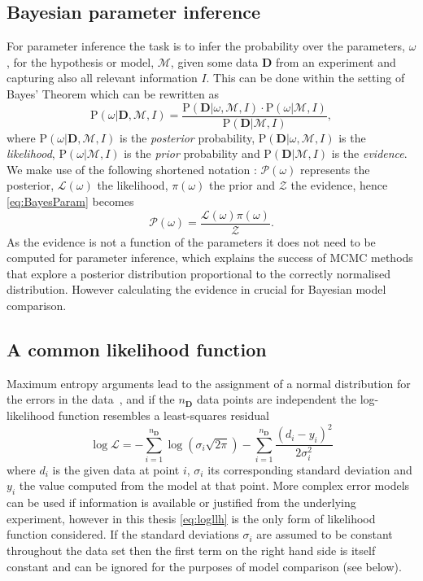 \subsection{Bayesian parameter inference}\label{ssec:Bayes}
For parameter inference the task is to infer the probability over the parameters, $\omega$, for the hypothesis or model, $\mathcal M$, given some data $\mathbf{D}$ from an experiment and capturing also all relevant information $I$.
This can be done within the setting of Bayes' Theorem which can be rewritten as
\begin{equation}
\mathrm{P}(\omega | \mathbf{D}, \mathcal M, I) = \frac{\mathrm{P}(\mathbf{D} | \omega,\mathcal M, I) \cdot \mathrm{P}(\omega |\mathcal M, I)}{\mathrm{P}( \mathbf{D} |\mathcal M, I)},
\label{eq:BayesParam}
\end{equation}
where $\mathrm{P}(\omega | \mathbf{D},\mathcal M, I)$ is the \emph{posterior} probability, $\mathrm{P}(\mathbf{D} | \omega,\mathcal M, I)$ is the \emph{likelihood}, $\mathrm{P}(\omega |\mathcal M, I)$ is the \emph{prior} probability and $\mathrm{P}( \mathbf{D} |\mathcal M, I)$ is the \emph{evidence}.
We make use of the following shortened notation \cite{sivia2006}: $\mathcal P(\omega)$ represents the posterior, $\mathcal L(\omega)$ the likelihood, $\pi(\omega)$ the prior and $\mathcal Z$ the evidence, hence \autoref{eq:BayesParam} becomes
\begin{equation*}
\mathcal P(\omega) = \frac{\mathcal L(\omega) \pi(\omega)}{\mathcal Z}.
\label{eq:Bayes2}
\end{equation*}
As the evidence is not a function of the parameters it does not need to be computed for parameter inference, which explains the success of MCMC methods that explore a posterior distribution proportional to the correctly normalised distribution.
However calculating the evidence in crucial for Bayesian model comparison.

\subsection{A common likelihood function}\label{sec:Introllh}
Maximum entropy arguments lead to the assignment of a normal distribution for the errors in the data~\cite{jaynes2003}, and if the $n_{\mathbf{D}}$ data points are independent the log-likelihood function resembles a least-squares residual
\begin{equation}
\log\mathcal L = -\sum_{i=1}^{n_{\mathbf{D}}}\log\left(\sigma_i\sqrt{2\pi}\right) - \sum_{i=1}^{n_{\mathbf{D}}} \frac{\left({{{d}}_i}-{{y}}_i\right)^2}{2\sigma_{i}^2}
\label{eq:logllh}
\end{equation}
where ${{d}}_i$ is the given data at point $i$, $\sigma_{i}$ its corresponding standard deviation and ${{y}}_i$ the value computed from the model at that point.
More complex error models can be used if information is available or justified from the underlying experiment, however in this thesis \autoref{eq:logllh} is the only form of likelihood function considered.
If the standard deviations $\sigma_{i}$ are assumed to be constant throughout the data set then the first term on the right hand side is itself constant and can be ignored for the purposes of model comparison (see below).

